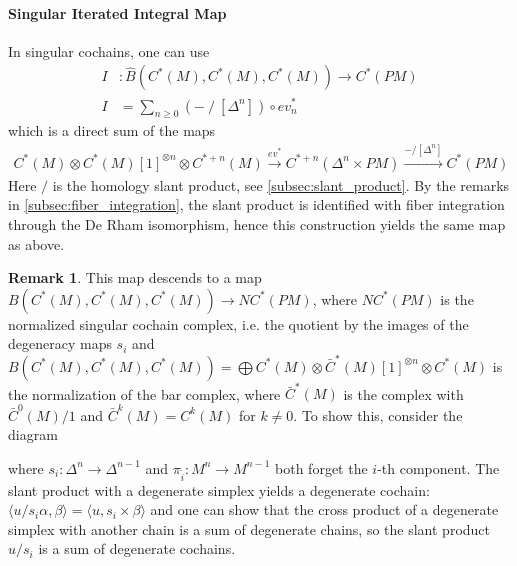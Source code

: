 \documentclass{scrartcl}
\theoremstyle{plain}
\theoremstyle{definition}
\newtheorem{remark}[theorem]{Remark}
\newcommand{\slant}{\mathbin{/}}
\let\xto\xrightarrow
\DeclareMathOperator{\id}{id}
\newcommand{\blank}{-}
\newcommand{\comp}{\mathbin{\circ}}
\begin{document}
\paragraph{Singular Iterated Integral Map} In singular cochains, one can use
\begin{align*}
    I&\colon \hat B(C^*(M), C^*(M), C^*(M)) \to C^*(PM) \\
    I&= \sum_{n\geq 0} (\blank \slant [\Delta^n]) \comp ev_n^*
\end{align*}
which is a direct sum of the maps 
\begin{align*}
    C^*(M)\otimes C^*(M)[1]^{\otimes n} \otimes C^{*+n}(M) \xto{ev^*} C^{*+n}(\Delta^n\times PM) \xto{\blank / [\Delta^n]} C^{*}(PM)
\end{align*}
Here $/$ is the homology slant product, see \ref{subsec:slant_product}. By the remarks in \ref{subsec:fiber_integration}, the slant product is identified with fiber integration through the De Rham isomorphism, hence this construction yields the same map as above.

\begin{remark}
    This map descends to a map $B(C^*(M), C^*(M), C^*(M)) \to NC^*(PM)$, where $NC^*(PM)$ is the normalized singular cochain complex, i.e. the quotient by the images of the degeneracy maps $s_i$ and $B(C^*(M), C^*(M), C^*(M)) = \bigoplus C^*(M)\otimes \bar C^*(M)[1]^{\otimes n}\otimes C^*(M)$ is the normalization of the bar complex, where $\bar C^*(M)$ is the complex with $\bar C^0(M) / 1$ and $\bar C^k(M) = C^k(M)$ for $k\neq 0$. To show this, consider the diagram

    \begin{center}
    \end{center}

    where $s_i\colon\Delta^n\to\Delta^{n-1}$ and $\pi_{\hat i}\colon M^{n}\to M^{n-1}$ both forget the $i$-th component. The slant product with a degenerate simplex yields a degenerate cochain: $\langle u / s_i\alpha, \beta\rangle = \langle u,s_i\times\beta\rangle$ and one can show that the cross product of a degenerate simplex with another chain is a sum of degenerate chains, so the slant product $u/s_i$ is a sum of degenerate cochains. 
\end{remark}
\end{document}
